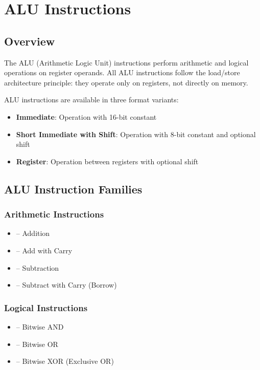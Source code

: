 \chapter{ALU Instructions}
\label{ch:alu-instructions}

\section{Overview}

The ALU (Arithmetic Logic Unit) instructions perform arithmetic and logical operations on register operands. All ALU
instructions follow the load/store architecture principle: they operate only on registers, not directly on memory.

ALU instructions are available in three format variants:
\begin{itemize}
	\item \textbf{Immediate}: Operation with 16-bit constant
	\item \textbf{Short Immediate with Shift}: Operation with 8-bit constant and optional shift
	\item \textbf{Register}: Operation between registers with optional shift
\end{itemize}

\section{ALU Instruction Families}

\subsection{Arithmetic Instructions}
\begin{itemize}
	\item {} -- Addition
	\item {} -- Add with Carry
	\item {} -- Subtraction
	\item {} -- Subtract with Carry (Borrow)
\end{itemize}

\subsection{Logical Instructions}
\begin{itemize}
	\item {} -- Bitwise AND
	\item {} -- Bitwise OR
	\item {} -- Bitwise XOR (Exclusive OR)
\end{itemize}

